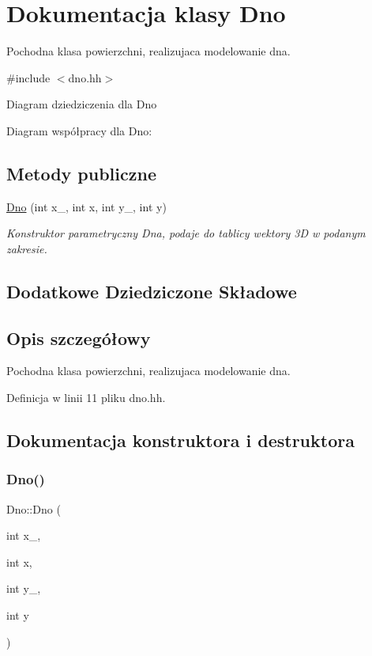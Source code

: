 \hypertarget{class_dno}{}\section{Dokumentacja klasy Dno}
\label{class_dno}


Pochodna klasa powierzchni, realizujaca modelowanie dna.  




{\ttfamily \#include $<$dno.\+hh$>$}



Diagram dziedziczenia dla Dno


Diagram współpracy dla Dno\+:
\subsection*{Metody publiczne}
\begin{DoxyCompactItemize}
\item 
\hyperlink{class_dno_a6daca2e343c28dac347b24c1bcdade91}{Dno} (int x\+\_, int x, int y\+\_, int y)
\begin{DoxyCompactList}\small\item\em Konstruktor parametryczny Dna, podaje do tablicy wektory 3D w podanym zakresie. \end{DoxyCompactList}\end{DoxyCompactItemize}
\subsection*{Dodatkowe Dziedziczone Składowe}


\subsection{Opis szczegółowy}
Pochodna klasa powierzchni, realizujaca modelowanie dna. 

Definicja w linii 11 pliku dno.\+hh.



\subsection{Dokumentacja konstruktora i destruktora}
\mbox{\label{class_dno_a6daca2e343c28dac347b24c1bcdade91}} 
\subsubsection{\texorpdfstring{Dno()}{Dno()}}
{\footnotesize\ttfamily Dno\+::\+Dno (\begin{DoxyParamCaption}\item[{int}]{x\+\_,  }\item[{int}]{x,  }\item[{int}]{y\+\_,  }\item[{int}]{y }\end{DoxyParamCaption})}



